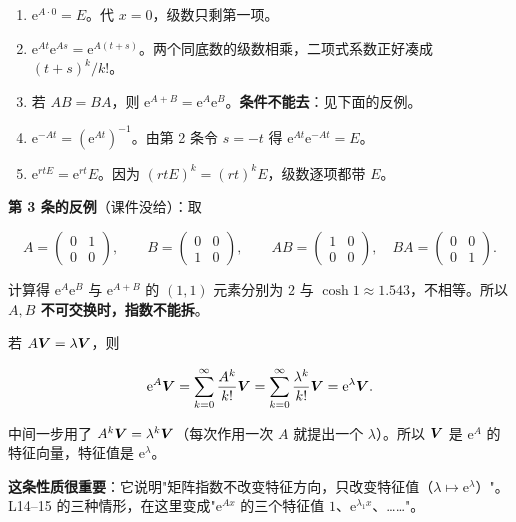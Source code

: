 \documentclass[11pt]{ctexart}
\newcommand{\mat}[1]{\begin{pmatrix}#1\end{pmatrix}}
\begin{document}


\begin{enumerate}
  \item $\mathrm{e}^{A\cdot0}=E$。代 $x=0$，级数只剩第一项。
  \item $\mathrm{e}^{At}\mathrm{e}^{As}=\mathrm{e}^{A(t+s)}$。两个同底数的级数相乘，二项式系数正好凑成 $(t+s)^k/k!$。
  \item 若 $AB=BA$，则 $\mathrm{e}^{A+B}=\mathrm{e}^A\mathrm{e}^B$。\textbf{条件不能去}：见下面的反例。
  \item $\mathrm{e}^{-At}=(\mathrm{e}^{At})^{-1}$。由第 2 条令 $s=-t$ 得 $\mathrm{e}^{At}\mathrm{e}^{-At}=E$。
  \item $\mathrm{e}^{rtE}=\mathrm{e}^{rt}E$。因为 $(rtE)^k=(rt)^kE$，级数逐项都带 $E$。
\end{enumerate}

\textbf{第 3 条的反例}（课件没给）：取

\[
A=\mat{0&1\\0&0},\qquad B=\mat{0&0\\1&0},\qquad AB=\mat{1&0\\0&0},\quad BA=\mat{0&0\\0&1}.
\]

计算得 $\mathrm{e}^{A}\mathrm{e}^{B}$ 与 $\mathrm{e}^{A+B}$ 的 $(1,1)$ 元素分别为 $2$ 与 $\cosh1\approx1.543$，不相等。所以 \textbf{$A,B$ 不可交换时，指数不能拆}。


若 $A\boldsymbol{V}=\lambda\boldsymbol{V}$，则

\[
\mathrm{e}^{A}\boldsymbol{V}=\sum_{k=0}^{\infty}\frac{A^k}{k!}\boldsymbol{V}
=\sum_{k=0}^{\infty}\frac{\lambda^k}{k!}\boldsymbol{V}
=\mathrm{e}^{\lambda}\boldsymbol{V}.
\]

中间一步用了 $A^k\boldsymbol{V}=\lambda^k\boldsymbol{V}$（每次作用一次 $A$ 就提出一个 $\lambda$）。所以 $\boldsymbol{V}$ 是 $\mathrm{e}^{A}$ 的特征向量，特征值是 $\mathrm{e}^{\lambda}$。

\textbf{这条性质很重要}：它说明"矩阵指数不改变特征方向，只改变特征值（$\lambda\mapsto\mathrm{e}^{\lambda}$）"。L14--15 的三种情形，在这里变成"$\mathrm{e}^{Ax}$ 的三个特征值 $1$、$\mathrm{e}^{\lambda_1x}$、……"。

\end{document}
